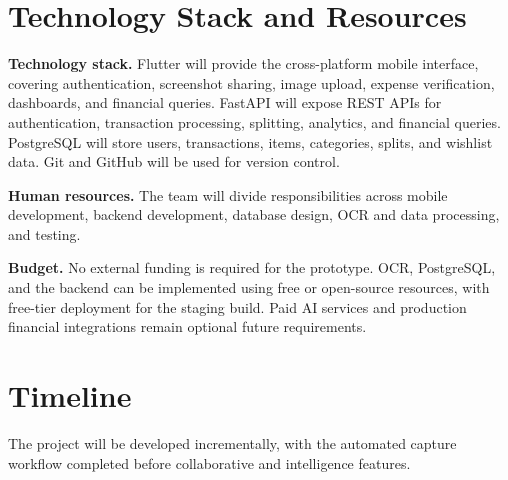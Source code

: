 \documentclass[11pt,a4paper]{article}
\begin{document}
\section{Technology Stack and Resources}

\noindent\textbf{Technology stack.}
Flutter will provide the cross-platform mobile interface, covering
authentication, screenshot sharing, image upload, expense verification,
dashboards, and financial queries. FastAPI will expose REST APIs for
authentication, transaction processing, splitting, analytics, and
financial queries. PostgreSQL will store users, transactions, items,
categories, splits, and wishlist data. Git and GitHub will be used for
version control.

\noindent\textbf{Human resources.}
The team will divide responsibilities across mobile development, backend
development, database design, OCR and data processing, and testing.

\noindent\textbf{Budget.}
No external funding is required for the prototype. OCR, PostgreSQL, and
the backend can be implemented using free or open-source resources, with
free-tier deployment for the staging build. Paid AI services and
production financial integrations remain optional future requirements.


\section{Timeline}

The project will be developed incrementally, with the automated capture
workflow completed before collaborative and intelligence features.
\end{document}
